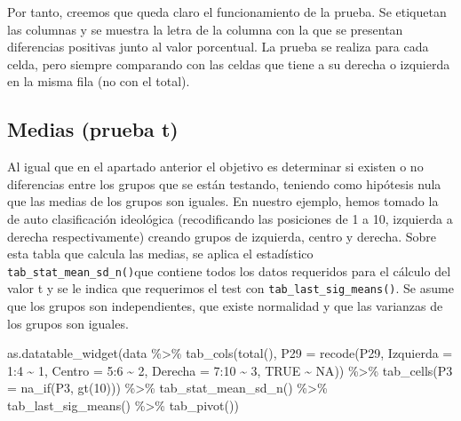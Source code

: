 \documentclass[
]{book}
\newenvironment{Shaded}{\begin{snugshade}}{\end{snugshade}}
\newcommand{\AttributeTok}[1]{\textcolor[rgb]{0.77,0.63,0.00}{#1}}
\newcommand{\ConstantTok}[1]{\textcolor[rgb]{0.00,0.00,0.00}{#1}}
\newcommand{\DecValTok}[1]{\textcolor[rgb]{0.00,0.00,0.81}{#1}}
\newcommand{\FunctionTok}[1]{\textcolor[rgb]{0.00,0.00,0.00}{#1}}
\newcommand{\NormalTok}[1]{#1}
\newcommand{\SpecialCharTok}[1]{\textcolor[rgb]{0.00,0.00,0.00}{#1}}
\begin{document}
Por tanto, creemos que queda claro el funcionamiento de la prueba. Se etiquetan las columnas y se muestra la letra de la columna con la que se presentan diferencias positivas junto al valor porcentual. La prueba se realiza para cada celda, pero siempre comparando con las celdas que tiene a su derecha o izquierda en la misma fila (no con el total).

\hypertarget{medias-prueba-t}{%
\subsection{Medias (prueba t)}\label{medias-prueba-t}}

Al igual que en el apartado anterior el objetivo es determinar si existen o no diferencias entre los grupos que se están testando, teniendo como hipótesis nula que las medias de los grupos son iguales. En nuestro ejemplo, hemos tomado la de auto clasificación ideológica (recodificando las posiciones de 1 a 10, izquierda a derecha respectivamente) creando grupos de izquierda, centro y derecha. Sobre esta tabla que calcula las medias, se aplica el estadístico \texttt{tab\_stat\_mean\_sd\_n()}que contiene todos los datos requeridos para el cálculo del valor t y se le indica que requerimos el test con \texttt{tab\_last\_sig\_means()}. Se asume que los grupos son independientes, que existe normalidad y que las varianzas de los grupos son iguales.

\begin{Shaded}
\begin{Highlighting}[]
\FunctionTok{as.datatable\_widget}\NormalTok{(data }\SpecialCharTok{\%\textgreater{}\%}
  \FunctionTok{tab\_cols}\NormalTok{(}\FunctionTok{total}\NormalTok{(), }\AttributeTok{P29 =} \FunctionTok{recode}\NormalTok{(P29, }\AttributeTok{Izquierda =} \DecValTok{1}\SpecialCharTok{:}\DecValTok{4} \SpecialCharTok{\textasciitilde{}}
    \DecValTok{1}\NormalTok{, }\AttributeTok{Centro =} \DecValTok{5}\SpecialCharTok{:}\DecValTok{6} \SpecialCharTok{\textasciitilde{}} \DecValTok{2}\NormalTok{, }\AttributeTok{Derecha =} \DecValTok{7}\SpecialCharTok{:}\DecValTok{10} \SpecialCharTok{\textasciitilde{}} \DecValTok{3}\NormalTok{, }\ConstantTok{TRUE} \SpecialCharTok{\textasciitilde{}} \ConstantTok{NA}\NormalTok{)) }\SpecialCharTok{\%\textgreater{}\%}
  \FunctionTok{tab\_cells}\NormalTok{(}\AttributeTok{P3 =} \FunctionTok{na\_if}\NormalTok{(P3, }\FunctionTok{gt}\NormalTok{(}\DecValTok{10}\NormalTok{))) }\SpecialCharTok{\%\textgreater{}\%}
  \FunctionTok{tab\_stat\_mean\_sd\_n}\NormalTok{() }\SpecialCharTok{\%\textgreater{}\%}
  \FunctionTok{tab\_last\_sig\_means}\NormalTok{() }\SpecialCharTok{\%\textgreater{}\%}
  \FunctionTok{tab\_pivot}\NormalTok{())}
\end{Highlighting}
\end{Shaded}
\end{document}
